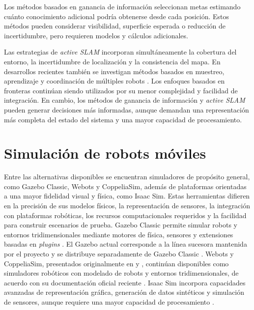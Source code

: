 Los métodos basados en ganancia de información seleccionan metas estimando
cuánto conocimiento adicional podría obtenerse desde cada posición. Estos
métodos pueden considerar visibilidad, superficie esperada o reducción de
incertidumbre, pero requieren modelos y cálculos adicionales.

Las estrategias de \textit{active SLAM} incorporan simultáneamente la
cobertura del entorno, la incertidumbre de localización y la consistencia del
mapa. En desarrollos recientes también se investigan métodos basados en
muestreo, aprendizaje y coordinación de múltiples robots
\citep{placed2023active}.
Los enfoques basados en fronteras continúan siendo utilizados por su menor
complejidad y facilidad de integración. En cambio, los métodos de ganancia de
información y \textit{active SLAM} pueden generar decisiones más informadas,
aunque demandan una representación más completa del estado del sistema y una
mayor capacidad de procesamiento.

\section{Simulación de robots móviles}
\label{sec:gemelo_digital}

Entre las alternativas disponibles se encuentran simuladores de propósito
general, como Gazebo Classic, Webots y CoppeliaSim, además de plataformas orientadas
a una mayor fidelidad visual y física, como Isaac Sim. Estas herramientas
difieren en la precisión de sus modelos físicos, la representación de
sensores, la integración con plataformas robóticas, los recursos
computacionales requeridos y la facilidad para construir escenarios de
prueba.
Gazebo Classic permite simular robots y entornos tridimensionales mediante
motores de física, sensores y extensiones basadas en \textit{plugins}
\citep{osrf2025gazeboclassic}. El Gazebo actual corresponde a la línea
sucesora mantenida por el proyecto y se distribuye separadamente de Gazebo
Classic \citep{openrobotics2024gazebo}. Webots y CoppeliaSim, presentados
originalmente en \citet{michel2004webots} y \citet{rohmer2013coppeliasim},
continúan disponibles como simuladores robóticos con modelado de robots y
entornos tridimensionales, de acuerdo con su documentación oficial reciente
\citep{cyberbotics2025webots,coppelia2025version}. Isaac Sim incorpora
capacidades avanzadas de representación gráfica, generación de
datos sintéticos y simulación de sensores, aunque requiere una mayor
capacidad de procesamiento \citep{nvidia2025isaacsim}.

